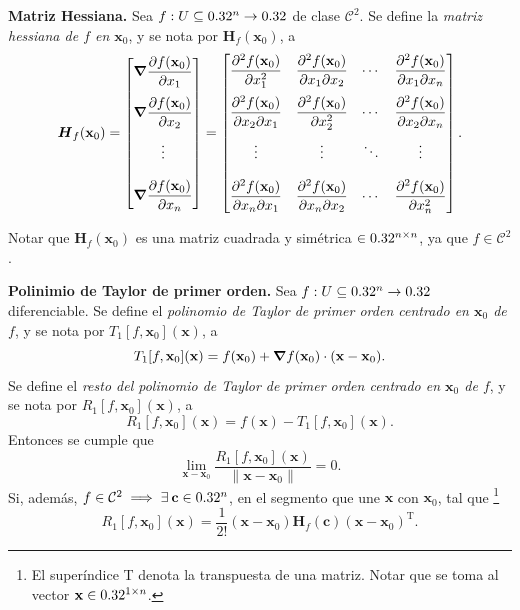 \label{sec:Taylor}

\begin{definition}\textbf{Matriz Hessiana.}
  Sea $f:U\subseteq0.32^n\to0.32$ de clase $\mathcal{C}^2$. Se define la \emph{matriz hessiana de $f$ en $\mathbf{x}_0$}, y se nota por $\boldsymbol{H}_f(\mathbf{x}_0)$, a 
  \[
    \boldsymbol{H}_f(\mathbf{x}_0)=
    \begin{bmatrix}
      \grad{\dif{f(\mathbf{x}_0)}{x_1}}\\[.4cm]
      \grad{\dif{f(\mathbf{x}_0)}{x_2}}\\[.4cm]
      \vdotswithin{f}\\[.4cm]
      \grad{\dif{f(\mathbf{x}_0)}{x_n}}
    \end{bmatrix}
    =
    \begin{bmatrix}
      \dfrac{\partial^2 f(\mathbf{x}_0)}{\partial x_1^2} & \dfrac{\partial^2 f(\mathbf{x}_0)}{\partial x_1 \partial x_2} &  \cdots & \dfrac{\partial^2 f(\mathbf{x}_0)}{\partial x_1 \partial x_n} \\[.4cm]
      \dfrac{\partial^2 f(\mathbf{x}_0)}{\partial x_2 \partial x_1} & \dfrac{\partial^2 f(\mathbf{x}_0)}{\partial x_2^2} & \cdots & \dfrac{\partial^2 f(\mathbf{x}_0)}{\partial x_2 \partial x_n} \\[.4cm]
      \vdots & \vdots & \ddots & \vdots \\[.4cm]
      \dfrac{\partial^2 f(\mathbf{x}_0)}{\partial x_n \partial x_1} & \dfrac{\partial^2 f(\mathbf{x}_0)}{\partial x_n \partial x_2} & \cdots & \dfrac{\partial^2 f(\mathbf{x}_0)}{\partial x_n^2}
    \end{bmatrix}.
\]
\end{definition}

\begin{obs}
Notar que $\boldsymbol{H}_f(\mathbf{x}_0)$ es una matriz cuadrada y sim\'etrica $\in 0.32^{n\times n}$, ya que $f\in\mathcal{C}^2$.
\end{obs}

\begin{theorem}\label{tayloro2} \textbf{Polinimio de Taylor de primer orden.}  Sea $f:U\subseteq0.32^n\to0.32$  diferenciable. Se define el \emph{polinomio de Taylor de primer orden centrado en $\mathbf{x}_0$ de $f$}, y se nota por $T_1[f,\mathbf{x}_0](\mathbf{x})$, a
  \[
    T_1[f,\mathbf{x}_0](\mathbf{x})=f(\mathbf{x}_0)+\grad{f}(\mathbf{x}_0)\cdot(\mathbf{x-x}_0).
  \]
  Se define el \emph{resto del polinomio de Taylor de primer orden centrado en $\mathbf{x}_0$ de $f$}, y se nota por $R_1[f,\mathbf{x}_0](\mathbf{x})$, a
  \[
    R_1[f,\mathbf{x}_0](\mathbf{x})=f(\mathbf{x})-T_1[f,\mathbf{x}_0](\mathbf{x}).
  \]
  Entonces se cumple que
  \[
    \lim_{\mathbf{x-x}_0}\dfrac{R_1[f,\mathbf{x}_0](\mathbf{x})}{\|\mathbf{x-x}_0\|}=0.
  \]
  Si, adem\'as, $f\in\mathcal{C}^2\implies\exists\:\mathbf{c}\in0.32^n$, en el segmento que une $\mathbf{x}$ con $\mathbf{x}_0$, tal que \footnote{El super\'indice T denota la transpuesta de una matriz. Notar que se toma al vector $\mathbf{x}\in0.32^{1\times n}$.}
  \[
    R_1[f,\mathbf{x}_0](\mathbf{x})=\frac{1}{2!}(\mathbf{x-x}_0)\boldsymbol{H}_f(\mathbf{c})(\mathbf{x-x}_0)^\text{T}.
  \]
\end{theorem}

